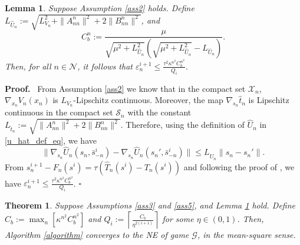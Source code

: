 \documentclass[twocolumn]{autart}
\newtheorem{theorem}{Theorem}
\newtheorem{lemma}{Lemma}
\newenvironment{proof}[1][Proof]{%
  \par\noindent\textbf{#1.}\ }{%
  \hfill$\square$\par
}
\begin{document}
\begin{lemma}\label{lemma2}
	Suppose Assumption \ref{ass2} holds. Define $L_{\widehat{U}_n}:=\sqrt{L_{V_n}^2+\|A_{nn}^n\|^2+2\|B_{nn}^n\|^2}$, and \[C_b^n:=\frac{\mu}{\sqrt{\mu^2+L_{\widehat{U}_n}^2}\left(\sqrt{\mu^2+L_{\widehat{U}_n}^2}-L_{\widehat{U}_n}\right)}.\] Then, for all $n\in\mathcal{N}$, it follows that $\varepsilon_n^{i+1}\leq \frac{\tau^2\kappa^{n^2}C_b^{n^2}}{Q_i}$.
\end{lemma}
\begin{proof}
	From Assumption \ref{ass2} we know that in the compact set $\mathcal{X}_n$, $\nabla_{x_n}V_n(x_n)$ is $L_{V_n}$-Lipschitz continuous. Moreover, the map $\nabla_{s_n} \hat{t}_n$ is Lipschitz continuous in the compact set $\mathcal{S}_n$ with the constant $L_{\hat{t}_n}:=\sqrt{\|A_{nn}^n\|^2+2\|B_{nn}^n\|^2}$. Therefore, using the definition of $\widehat{U}_n$ in \eqref{u_hat_def_eq}, we have
    \[\|\nabla_{s_n}\widehat{U}_n(s_n, \bar{s}_{-n}^i)-\nabla_{s_n}\widehat{U}_n(s_n', \bar{s}_{-n}^i)\|\leq L_{\widehat{U}_n}\|s_n-s_n'\|.\]
    From $s_n^{i+1}-F_n(s^i)=\tau(\widehat{T}_n(s^i)-T_n(s^i))$ and following the proof of \cite[Lemma 8]{lei2022distributed}, we have $\varepsilon_n^{i+1}\leq \frac{\tau^2\kappa^{n^2}C_b^{n^2}}{Q_i}$.
\end{proof}
\begin{theorem}\label{theorem4}
	Suppose Assumptions \ref{ass3} and \ref{ass5}, and Lemma \ref{lemma2} hold. Define $C_b:=\max_{n}{[\kappa^{n^2}C_b^{n^2}]}$ and $Q_i:=\left\lceil\frac{C_b}{\eta^{2(i+1)}}\right\rceil$ for some $\eta\in(0,1)$. Then, Algorithm \ref{algorithm} converges to the NE of game $\mathcal{G}$, in the mean-square sense. 
\end{theorem}
\end{document}

